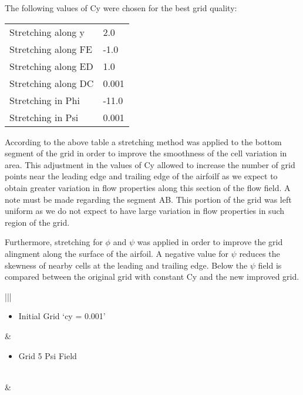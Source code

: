 \documentclass[letterpaper,10pt,english]{sphinxmanual}
\begin{document}
The following values of Cy were chosen for the best grid quality:


\begin{savenotes}\sphinxattablestart
\centering
\begin{tabulary}{\linewidth}[t]{|T|T|}
\hline
{}\relax &\relax \\
\hline
Stretching along y
&
2.0
\\
\hline
Stretching along FE
&
-1.0
\\
\hline
Stretching along ED
&
1.0
\\
\hline
Stretching along DC
&
0.001
\\
\hline
Stretching in Phi
&
-11.0
\\
\hline
Stretching in Psi
&
0.001
\\
\hline
\end{tabulary}
\par
\sphinxattableend\end{savenotes}

According to the above table a stretching method was applied to the bottom segment of the grid in order to improve the smoothness of the cell variation in area. This adjustment in the values of Cy allowed to increase the number of grid points near the leading edge and trailing edge of the airfoilf as we expect to obtain greater variation in flow properties along this section of the flow field.
A note must be made regarding the segment AB. This portion of the grid was left uniform as we do not expect to have large variation in flow properties in such region of the grid.

Furthermore, stretching for \(\phi\) and \(\psi\) was applied in order to improve the grid alingment along the surface of the airfoil. A negative value for \(\psi\)  reduces the skewness of nearby cells at the leading and trailing edge. Below the \(\psi\)  field is compared between the original grid with constant Cy and the new improved grid.


\begin{savenotes}\sphinxattablestart
\centering
\begin{tabular}[t]{|*{2}{|}}
\hline
\begin{itemize}
\item {} 
Initial Grid ‘cy = 0.001’

\end{itemize}
&\begin{itemize}
\item {} 
Grid 5 Psi Field

\end{itemize}
\\
\hline
\noindent{}
&
\noindent{}
\\
\hline
\end{tabular}
\par
\sphinxattableend\end{savenotes}
\end{document}
